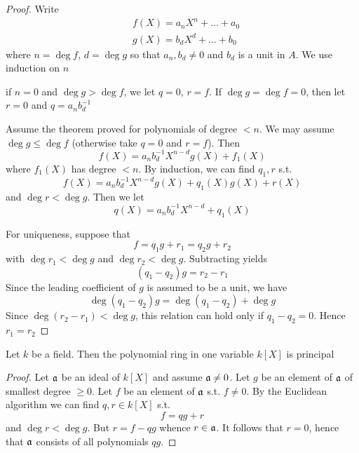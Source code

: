 \documentclass[11pt]{article}
\begin{document}
\begin{proof}
Write
\begin{align*}
&f(X)=a_nX^n+\dots+a_0\\
&g(X)=b_dX^d+\dots+b_0
\end{align*}
where \(n=\deg f\), \(d=\deg g\) so that \(a_n,b_d\neq 0\) and \(b_d\) is a unit in \(A\). We use
induction on \(n\)

if \(n=0\) and \(\deg g>\deg f\), we let \(q=0\), \(r=f\). If \(\deg g=\deg f=0\), then
let \(r=0\) and \(q=a_nb_d^{-1}\)

Assume the theorem proved for polynomials of degree \(<n\). We may assume \(\deg g\le\deg f\)
(otherwise take \(q=0\) and \(r=f\)). Then
\begin{equation*}
f(X)=a_nb^{-1}_dX^{n-d}g(X)+f_1(X)
\end{equation*}
where \(f_1(X)\) has degree \(<n\). By induction, we can find \(q_1,r\) s.t.
\begin{equation*}
f(X)=a_nb_d^{-1}X^{n-d}g(X)+q_1(X)g(X)+r(X)
\end{equation*}
and \(\deg r<\deg g\). Then we let
\begin{equation*}
q(X)=a_nb_d^{-1}X^{n-d}+q_1(X)
\end{equation*}

For uniqueness, suppose that
\begin{equation*}
f=q_1g+r_1=q_2g+r_2
\end{equation*}
with \(\deg r_1<\deg g\) and \(\deg r_2<\deg g\). Subtracting yields
\begin{equation*}
(q_1-q_2)g=r_2-r_1
\end{equation*}
Since the leading coefficient of \(g\) is assumed to be a unit, we have
\begin{equation*}
\deg(q_1-q_2)g=\deg(q_1-q_2)+\deg g
\end{equation*}
Since \(\deg(r_2-r_1)<\deg g\), this relation can hold only if \(q_1-q_2=0\). Hence \(r_1=r_2\)
\end{proof}

\begin{theorem}[]
Let \(k\) be a field. Then the polynomial ring in one variable \(k[X]\) is principal
\end{theorem}

\begin{proof}
Let \(\mathfrak{a}\) be an ideal of \(k[X]\) and assume \(\mathfrak{a}\neq 0\). Let \(g\) be an element of \(\mathfrak{a}\) of
smallest degree \(\ge 0\). Let \(f\) be an element of \(\mathfrak{a}\) s.t. \(f\neq 0\). By the Euclidean
algorithm we can find \(q,r\in k[X]\) s.t.
\begin{equation*}
f=qg+r
\end{equation*}
and \(\deg r<\deg g\). But \(r=f-qg\) whence \(r\in\mathfrak{a}\). It follows that \(r=0\), hence that \(\mathfrak{a}\)
consists of all polynomials \(qg\).
\end{proof}
\end{document}
